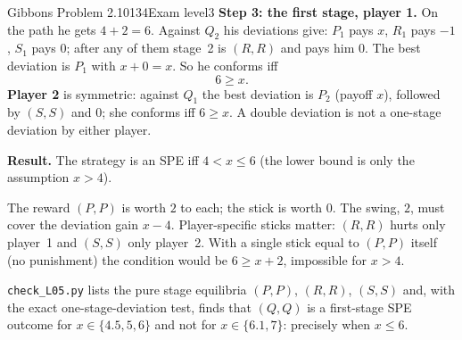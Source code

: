 \begin{exsol}{Gibbons Problem 2.10}{134}{Exam level}{3}
\textbf{Step 3: the first stage, player 1.} On the path he gets $4 + 2 = 6$. Against $Q_2$ his deviations
give: $P_1$ pays $x$, $R_1$ pays $-1$, $S_1$ pays $0$; after any of them stage~2 is $(R,R)$ and pays him $0$.
The best deviation is $P_1$ with $x + 0 = x$. So he conforms iff
\[
  6 \ge x .
\]
\textbf{Player 2} is symmetric: against $Q_1$ the best deviation is $P_2$ (payoff $x$), followed by $(S,S)$ and
$0$; she conforms iff $6 \ge x$. A double deviation is not a one-stage deviation by either player.

\textbf{Result.} The strategy is an SPE iff $4 < x \le 6$ (the lower bound is only the assumption $x>4$).

\interp The reward $(P,P)$ is worth $2$ to each; the stick is worth $0$. The swing, $2$, must cover the
deviation gain $x - 4$. Player-specific sticks matter: $(R,R)$ hurts only player~1 and $(S,S)$ only
player~2. With a single stick equal to $(P,P)$ itself (no punishment) the condition would be $6 \ge x + 2$,
impossible for $x > 4$.

\verify \texttt{check\_L05.py} lists the pure stage equilibria $(P,P)$, $(R,R)$, $(S,S)$ and, with the exact
one-stage-deviation test, finds that $(Q,Q)$ is a first-stage SPE outcome for $x \in \{4.5, 5, 6\}$ and not for
$x \in \{6.1, 7\}$: precisely when $x \le 6$.

\end{exsol}
